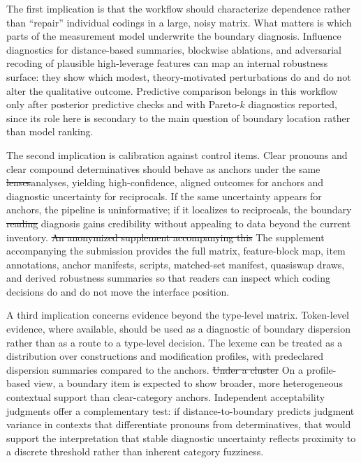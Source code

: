 \documentclass[12pt]{article}
\providecommand{\DIFaddtex}[1]{{\protect\color{DIFgreen}#1}} %
\providecommand{\DIFdeltex}[1]{{\protect\color{red}\sout{#1}}}                      %
\providecommand{\DIFaddbegin}{} %
\providecommand{\DIFaddend}{} %
\providecommand{\DIFdelbegin}{} %
\providecommand{\DIFdelend}{} %
\providecommand{\DIFadd}[1]{\texorpdfstring{\DIFaddtex{#1}}{#1}} %
\providecommand{\DIFdel}[1]{\texorpdfstring{\DIFdeltex{#1}}{}} %
\newcommand{\DIFscaledelfig}{0.5}
\newlength{\DIFdelgraphicswidth} %
\newlength{\DIFdelgraphicsheight} %
\newcommand{\DIFaddincludegraphics}[2][]{{\color{DIFgreen}\fbox{\DIFOincludegraphics[#1]{#2}}}} %
\newcommand{\DIFdelincludegraphics}[2][]{%
\sbox{\DIFdelgraphicsbox}{\DIFOincludegraphics[#1]{#2}}%
\settoboxwidth{\DIFdelgraphicswidth}{\DIFdelgraphicsbox} %
\settoboxtotalheight{\DIFdelgraphicsheight}{\DIFdelgraphicsbox} %
\scalebox{\DIFscaledelfig}{%
\parbox[b]{\DIFdelgraphicswidth}{\usebox{\DIFdelgraphicsbox}\\[-\baselineskip] \rule{\DIFdelgraphicswidth}{0em}}\llap{\resizebox{\DIFdelgraphicswidth}{\DIFdelgraphicsheight}{%
\setlength{\unitlength}{\DIFdelgraphicswidth}%
\begin{picture}(1,1)%
\thicklines\linethickness{2pt} %
{\color[rgb]{1,0,0}\put(0,0){\framebox(1,1){}}}%
{\color[rgb]{1,0,0}\put(0,0){\line( 1,1){1}}}%
{\color[rgb]{1,0,0}\put(0,1){\line(1,-1){1}}}%
\end{picture}%
}\hspace*{3pt}}} %
} %
\DeclareRobustCommand{\DIFaddbegin}{\DIFOaddbegin \let\includegraphics\DIFaddincludegraphics} %
\DeclareRobustCommand{\DIFaddend}{\DIFOaddend \let\includegraphics\DIFOincludegraphics} %
\DeclareRobustCommand{\DIFdelbegin}{\DIFOdelbegin \let\includegraphics\DIFdelincludegraphics} %
\DeclareRobustCommand{\DIFdelend}{\DIFOaddend \let\includegraphics\DIFOincludegraphics} %
\begin{document}
The first implication is that the workflow should characterize dependence rather than \enquote{repair} individual codings in a large, noisy matrix. What matters is which parts of the measurement model underwrite the boundary diagnosis. Influence diagnostics for distance-based summaries, blockwise ablations, and adversarial recoding of plausible high-leverage features can map an internal robustness surface: they show which modest, theory-motivated perturbations do and do not alter the qualitative outcome. Predictive comparison belongs in this workflow only after posterior predictive checks and with Pareto-$k$ diagnostics reported, since its role here is secondary to the main question of boundary location rather than model ranking.

The second implication is calibration against control items. Clear pronouns and clear compound determinatives should behave as anchors under the same \DIFdelbegin \DIFdel{lenses}\DIFdelend \DIFaddbegin \DIFadd{analyses}\DIFaddend , yielding high-confidence, aligned outcomes for anchors and diagnostic uncertainty for reciprocals. If the same uncertainty appears for anchors, the pipeline is uninformative; if it localizes to reciprocals, the boundary \DIFdelbegin \DIFdel{reading }\DIFdelend \DIFaddbegin \DIFadd{diagnosis }\DIFaddend gains credibility without appealing to data beyond the current inventory. \DIFdelbegin \DIFdel{An anonymized supplement accompanying this }\DIFdelend \DIFaddbegin \DIFadd{The supplement accompanying the }\DIFaddend submission provides the full matrix, feature-block map, item annotations, anchor manifests, scripts, matched-set manifest, quasiswap draws, and derived robustness summaries so that readers can inspect which coding decisions do and do not move the interface position.

A third implication concerns evidence beyond the type-level matrix. Token-level evidence, where available, should be used as a diagnostic of boundary dispersion rather than as a route to a type-level decision. The lexeme can be treated as a distribution over constructions and modification profiles, with predeclared dispersion summaries compared to the anchors. \DIFdelbegin \DIFdel{Under a cluster }\DIFdelend \DIFaddbegin \DIFadd{On a profile-based }\DIFaddend view, a boundary item is expected to show broader, more heterogeneous contextual support than clear-category anchors. Independent acceptability judgments offer a complementary test: if distance-to-boundary predicts judgment variance in contexts that differentiate pronouns from determinatives, that would support the interpretation that stable diagnostic uncertainty reflects proximity to a discrete threshold rather than inherent category fuzziness.
\end{document}
